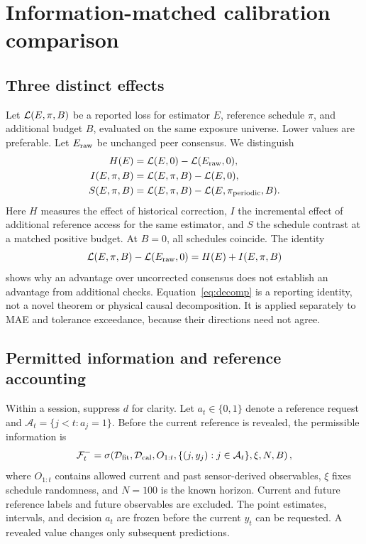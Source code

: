 \section{Information-matched calibration comparison}\label{sec:methods}
\subsection{Three distinct effects}
Let $\mathcal{L}(E,\pi,B)$ be a reported loss for estimator $E$, reference schedule $\pi$, and additional budget $B$, evaluated on the same exposure universe. Lower values are preferable. Let $E_{\rm raw}$ be unchanged peer consensus. We distinguish
\begin{align}
H(E)&=\mathcal{L}(E,0)-\mathcal{L}(E_{\rm raw},0),\label{eq:historical}\\
I(E,\pi,B)&=\mathcal{L}(E,\pi,B)-\mathcal{L}(E,0),\label{eq:incremental}\\
S(E,\pi,B)&=\mathcal{L}(E,\pi,B)-\mathcal{L}(E,\pi_{\rm periodic},B).
\label{eq:scheduling}
\end{align}
Here $H$ measures the effect of historical correction, $I$ the incremental effect of additional reference access for the same estimator, and $S$ the schedule contrast at a matched positive budget. At $B=0$, all schedules coincide. The identity
\begin{equation}
\mathcal{L}(E,\pi,B)-\mathcal{L}(E_{\rm raw},0)=H(E)+I(E,\pi,B)
\label{eq:decomp}
\end{equation}
shows why an advantage over uncorrected consensus does not establish an advantage from additional checks. Equation~\eqref{eq:decomp} is a reporting identity, not a novel theorem or physical causal decomposition. It is applied separately to MAE and tolerance exceedance, because their directions need not agree.

\subsection{Permitted information and reference accounting}
Within a session, suppress $d$ for clarity. Let $a_t\in\{0,1\}$ denote a reference request and $\mathcal A_t=\{j<t:a_j=1\}$. Before the current reference is revealed, the permissible information is
\begin{equation}
\mathcal F_t^- =\sigma\!\left(\mathcal D_{\rm fit},\mathcal D_{\rm cal},
O_{1:t},\{(j,y_j):j\in\mathcal A_t\},\xi,N,B\right),
\label{eq:filtration}
\end{equation}
where $O_{1:t}$ contains allowed current and past sensor-derived observables, $\xi$ fixes schedule randomness, and $N=100$ is the known horizon. Current and future reference labels and future observables are excluded. The point estimates, intervals, and decision $a_t$ are frozen before the current $y_t$ can be requested. A revealed value changes only subsequent predictions.

